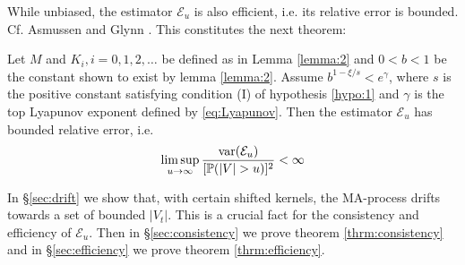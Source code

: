 While unbiased, the estimator $\mathcal E_u$ is also efficient,
i.e. its relative error is bounded. Cf. Asmussen and Glynn
\cite{opac-b1123521}. This constitutes the next theorem:
\begin{theorem}
  \label{thrm:efficiency}
  Let $M$ and $K_i, i=0, 1, 2, \dots$ be defined as in Lemma
  \ref{lemma:2} and $0 < b <1$ be the constant shown to exist by lemma
  \ref{lemma:2}.
  Assume $b^{1- \xi/s} < e^\gamma$, where $s$ is the
  positive constant satisfying condition (I) of hypothesis
  \ref{hypo:1} and $\gamma$ is the top 
  Lyapunov exponent defined by \eqref{eq:Lyapunov}.
  Then the estimator $\mathcal E_u$ has bounded relative error, i.e.
  \begin{equation*}
    \limsup_{u \to \infty} {\text{var}(\mathcal E_u) \over [\mathbb{P}(|V| > u)]^2} < \infty
  \end{equation*}
\end{theorem}
In \S\ref{sec:drift} we show that, with certain shifted kernels, the
MA-process drifts towards a set of bounded $|V_t|$. This is a crucial
fact for the consistency and efficiency of $\mathcal E_u$.
Then in \S\ref{sec:consistency} we prove theorem
\ref{thrm:consistency} and in \S\ref{sec:efficiency} we prove theorem
\ref{thrm:efficiency}.

